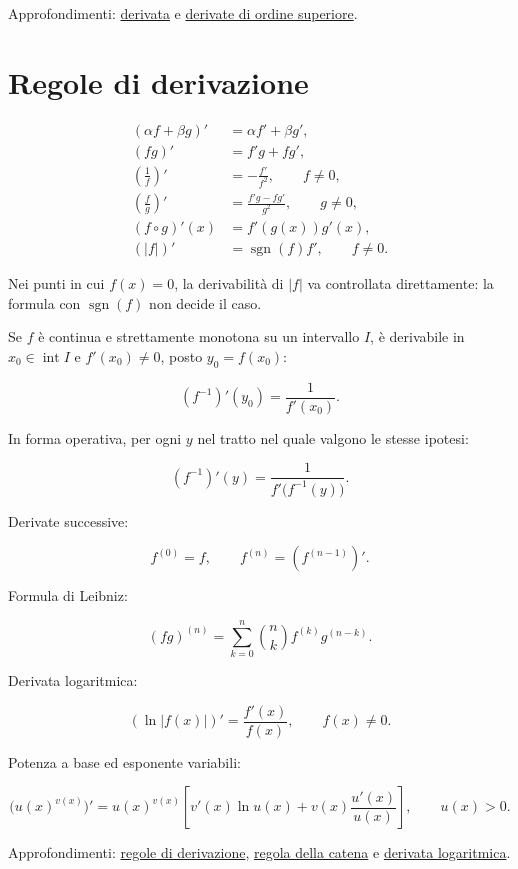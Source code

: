 Approfondimenti: \href{https://ingegnerismo.it/matematica/derivata/}{derivata} e \href{https://ingegnerismo.it/matematica/derivata-ordine-superiore/}{derivate di ordine superiore}.

\section{Regole di derivazione}\label{regole-di-derivazione}

\[
\begin{aligned}
(\alpha f+\beta g)'&=\alpha f'+\beta g',\\
(fg)'&=f'g+fg',\\
\left(\frac1f\right)'&=-\frac{f'}{f^2},\qquad f\ne0,\\
\left(\frac fg\right)'&=\frac{f'g-fg'}{g^2},\qquad g\ne0,\\
(f\circ g)'(x)&=f'(g(x))g'(x),\\
(|f|)'&=\operatorname{sgn}(f)f',\qquad f\ne0.
\end{aligned}
\]

Nei punti in cui \(f(x)=0\), la derivabilità di \(|f|\) va controllata direttamente: la formula con \(\operatorname{sgn}(f)\) non decide il caso.

Se \(f\) è continua e strettamente monotona su un intervallo \(I\), è derivabile in \(x_0\in\operatorname{int}I\) e \(f'(x_0)\ne0\), posto \(y_0=f(x_0)\):

\[
\displaystyle
(f^{-1})'(y_0)=\frac{1}{f'(x_0)}.
\]

In forma operativa, per ogni \(y\) nel tratto nel quale valgono le stesse ipotesi:

\[
(f^{-1})'(y)
=\frac{1}{f'\bigl(f^{-1}(y)\bigr)}.
\]

Derivate successive:

\[
\displaystyle
f^{(0)}=f,
\qquad
f^{(n)}=(f^{(n-1)})'.
\]

Formula di Leibniz:

\[
\displaystyle
(fg)^{(n)}
=
\sum_{k=0}^{n}\binom nk f^{(k)}g^{(n-k)}.
\]

Derivata logaritmica:

\[
\displaystyle
(\ln|f(x)|)'=\frac{f'(x)}{f(x)},
\qquad f(x)\ne0.
\]

Potenza a base ed esponente variabili:

\[
\displaystyle
\bigl(u(x)^{v(x)}\bigr)'
=
u(x)^{v(x)}
\left[
v'(x)\ln u(x)+v(x)\frac{u'(x)}{u(x)}
\right],
\qquad u(x)>0.
\]

Approfondimenti: \href{https://ingegnerismo.it/matematica/regole-di-derivazione/}{regole di derivazione}, \href{https://ingegnerismo.it/matematica/regola-della-catena/}{regola della catena} e \href{https://ingegnerismo.it/matematica/derivata-logaritmica/}{derivata logaritmica}.

